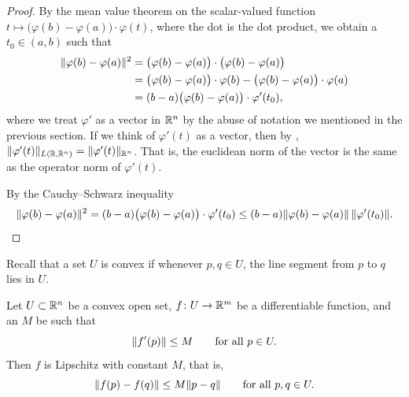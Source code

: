 \begin{proof}
By the mean value theorem on the scalar-valued function
$t \mapsto \bigl(\varphi(b)-\varphi(a) \bigr) \cdot \varphi(t)$,
where the dot is the dot product, we obtain
a $t_0 \in (a,b)$ such that
\begin{equation*}
\begin{split}
\lVert {\varphi(b)-\varphi(a)} \rVert^2
& =
\bigl( \varphi(b)-\varphi(a) \bigr)
\cdot
\bigl( \varphi(b)-\varphi(a) \bigr)
\\
& =
\bigl(\varphi(b)-\varphi(a) \bigr) \cdot \varphi(b) - 
\bigl(\varphi(b)-\varphi(a) \bigr) \cdot \varphi(a)
\\
& = 
(b-a)
\bigl(\varphi(b)-\varphi(a) \bigr) \cdot \varphi'(t_0) ,
\end{split}
\end{equation*}
where we treat $\varphi'$ as a vector in ${\mathbb{R}}^n$ by the abuse of
notation we mentioned in the previous section.
If we think of $\varphi'(t)$ as a vector, then by
,
$\lVert {\varphi'(t)} \rVert_{L({\mathbb{R}},{\mathbb{R}}^n)} = \lVert {\varphi'(t)} \rVert_{{\mathbb{R}}^n}$.
That is, the euclidean norm of the vector is the same as the operator norm
of $\varphi'(t)$.

By the Cauchy--Schwarz inequality
\begin{equation*}
\lVert {\varphi(b)-\varphi(a)} \rVert^2
=
(b-a)\bigl(\varphi(b)-\varphi(a) \bigr) \cdot \varphi'(t_0)
\leq
(b-a)
\lVert {\varphi(b)-\varphi(a)} \rVert \, \lVert {\varphi'(t_0)} \rVert . \qedhere
\end{equation*}
\end{proof}

Recall that a set $U$ is convex
if whenever $p,q \in U$, the line segment from
$p$ to $q$ lies in $U$.

\begin{prop} \label{mv:prop:convexlip}
Let $U \subset {\mathbb{R}}^n$ be a convex open set, $f \colon U \to {\mathbb{R}}^m$
be a differentiable function, and an $M$ be such that
\begin{equation*}
\lVert {f'(p)} \rVert \leq M
\qquad \text{for all } p \in U.
\end{equation*}
Then $f$ is Lipschitz with constant $M$, that is,
\begin{equation*}
\lVert {f(p)-f(q)} \rVert \leq M \lVert {p-q} \rVert
\qquad
\text{for all } p,q \in U.
\end{equation*}
\end{prop}

